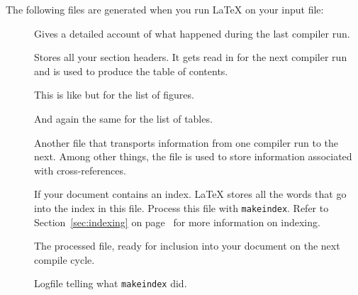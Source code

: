 The following files are generated when you run \LaTeX{} on your input
file:
\begin{description}
  \item[] Gives a detailed account of what happened during the
    last compiler run.
  \item[] Stores all your section headers. It gets read in for the
    next compiler run and is used to produce the table of contents.
  \item[] This is like  but for the list of figures.
  \item[] And again the same for the list of tables.
  \item[] Another file that transports information from one
    compiler run to the next. Among other things, the  file is used
    to store information associated with cross-references.
  \item[] If your document contains an index. \LaTeX{} stores all
    the words that go into the index in this file. Process this file with
    \texttt{makeindex}. Refer to Section~\ref{sec:indexing} on
    page~\pageref{sec:indexing} for more information on indexing.
  \item[] The processed  file, ready for inclusion into your
    document on the next compile cycle.
  \item[] Logfile telling what \texttt{makeindex} did.
\end{description}

